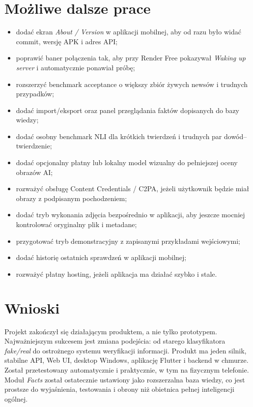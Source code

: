 \documentclass[12pt,a4paper]{article}
\begin{document}
\section{Możliwe dalsze prace}
\begin{itemize}
  \item dodać ekran \textit{About / Version} w aplikacji mobilnej, aby od razu było widać commit, wersję APK i adres API;
  \item poprawić baner połączenia tak, aby przy Render Free pokazywał \textit{Waking up server} i automatycznie ponawiał próbę;
  \item rozszerzyć benchmark acceptance o większy zbiór żywych newsów i trudnych przypadków;
  \item dodać import/eksport oraz panel przeglądania faktów dopisanych do bazy wiedzy;
  \item dodać osobny benchmark NLI dla krótkich twierdzeń i trudnych par dowód--twierdzenie;
  \item dodać opcjonalny płatny lub lokalny model wizualny do pełniejszej oceny obrazów AI;
  \item rozważyć obsługę Content Credentials / C2PA, jeżeli użytkownik będzie miał obrazy z podpisanym pochodzeniem;
  \item dodać tryb wykonania zdjęcia bezpośrednio w aplikacji, aby jeszcze mocniej kontrolować oryginalny plik i metadane;
  \item przygotować tryb demonstracyjny z zapisanymi przykładami wejściowymi;
  \item dodać historię ostatnich sprawdzeń w aplikacji mobilnej;
  \item rozważyć płatny hosting, jeżeli aplikacja ma działać szybko i stale.
\end{itemize}

\section{Wnioski}
Projekt zakończył się działającym produktem, a nie tylko prototypem.
Najważniejszym sukcesem jest zmiana podejścia: od starego klasyfikatora \textit{fake/real} do ostrożnego systemu weryfikacji informacji.
Produkt ma jeden silnik, stabilne API, Web UI, desktop Windows, aplikację Flutter i backend w chmurze.
Został przetestowany automatycznie i praktycznie, w tym na fizycznym telefonie.
Moduł \textit{Facts} został ostatecznie ustawiony jako rozszerzalna baza wiedzy, co jest prostsze do wyjaśnienia, testowania i obrony niż obietnica pełnej inteligencji ogólnej.
\end{document}
